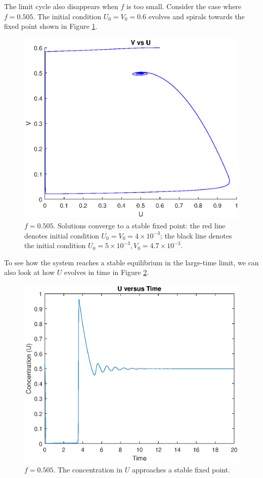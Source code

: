 \documentclass[twocolumn,amsmath,amssymb,aps]{revtex4}
\begin{document}
The limit cycle also disappears when $f$ is too small. Consider the case where $f = 0.505$. The initial condition $U_0 = V_0 = 0.6$ evolves and spirals towards the fixed point shown in Figure \ref{fig:hopf2}.
\begin{figure}[!htb]
	\centering
	\includegraphics[scale=0.6]{hopf2.eps}
	\caption{$f = 0.505$. Solutions converge to a stable fixed point: the red line denotes initial condition $U_0 =V_0 = 4\times 10^{-3}$; the black line denotes the initial condition $U_0 = 5\times 10^{-3}, V_0 = 4.7 \times 10^{-3}$.}
	\label{fig:hopf2}
\end{figure}
To see how the system reaches a stable equilibrium in the large-time limit, we can also look at how $U$ evolves in time in Figure \ref{fig:UEvolves}.
\begin{figure}[!htb]
	\centering
	\includegraphics[scale=0.6]{hopf2_time.eps}
	\caption{$f = 0.505$. The concentration in $U$ approaches a stable fixed point.}
	\label{fig:UEvolves}
\end{figure}
\end{document}

